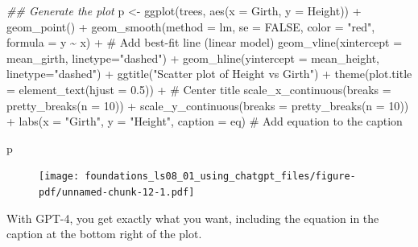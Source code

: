 \documentclass[
  letterpaper,
  DIV=11,
  numbers=noendperiod]{scrreprt}
\newenvironment{Shaded}{\begin{snugshade}}{\end{snugshade}}
\newcommand{\AttributeTok}[1]{\textcolor[rgb]{0.40,0.45,0.13}{#1}}
\newcommand{\CommentTok}[1]{\textcolor[rgb]{0.37,0.37,0.37}{#1}}
\newcommand{\ConstantTok}[1]{\textcolor[rgb]{0.56,0.35,0.01}{#1}}
\newcommand{\DecValTok}[1]{\textcolor[rgb]{0.68,0.00,0.00}{#1}}
\newcommand{\DocumentationTok}[1]{\textcolor[rgb]{0.37,0.37,0.37}{\textit{#1}}}
\newcommand{\FloatTok}[1]{\textcolor[rgb]{0.68,0.00,0.00}{#1}}
\newcommand{\FunctionTok}[1]{\textcolor[rgb]{0.28,0.35,0.67}{#1}}
\newcommand{\NormalTok}[1]{\textcolor[rgb]{0.00,0.23,0.31}{#1}}
\newcommand{\OtherTok}[1]{\textcolor[rgb]{0.00,0.23,0.31}{#1}}
\newcommand{\SpecialCharTok}[1]{\textcolor[rgb]{0.37,0.37,0.37}{#1}}
\newcommand{\StringTok}[1]{\textcolor[rgb]{0.13,0.47,0.30}{#1}}
\begin{document}
\begin{Shaded}
\begin{Highlighting}[]
\DocumentationTok{\#\# Generate the plot}
\NormalTok{p }\OtherTok{\textless{}{-}} \FunctionTok{ggplot}\NormalTok{(trees, }\FunctionTok{aes}\NormalTok{(}\AttributeTok{x =}\NormalTok{ Girth, }\AttributeTok{y =}\NormalTok{ Height)) }\SpecialCharTok{+}
  \FunctionTok{geom\_point}\NormalTok{() }\SpecialCharTok{+}
  \FunctionTok{geom\_smooth}\NormalTok{(}\AttributeTok{method =} \StringTok{\textquotesingle{}lm\textquotesingle{}}\NormalTok{, }\AttributeTok{se =} \ConstantTok{FALSE}\NormalTok{, }\AttributeTok{color =} \StringTok{"red"}\NormalTok{, }
              \AttributeTok{formula =}\NormalTok{ y }\SpecialCharTok{\textasciitilde{}}\NormalTok{ x) }\SpecialCharTok{+} \CommentTok{\# Add best{-}fit line (linear model)}
  \FunctionTok{geom\_vline}\NormalTok{(}\AttributeTok{xintercept =}\NormalTok{ mean\_girth, }\AttributeTok{linetype=}\StringTok{"dashed"}\NormalTok{) }\SpecialCharTok{+} 
  \FunctionTok{geom\_hline}\NormalTok{(}\AttributeTok{yintercept =}\NormalTok{ mean\_height, }\AttributeTok{linetype=}\StringTok{"dashed"}\NormalTok{) }\SpecialCharTok{+}
  \FunctionTok{ggtitle}\NormalTok{(}\StringTok{"Scatter plot of Height vs Girth"}\NormalTok{) }\SpecialCharTok{+}
  \FunctionTok{theme}\NormalTok{(}\AttributeTok{plot.title =} \FunctionTok{element\_text}\NormalTok{(}\AttributeTok{hjust =} \FloatTok{0.5}\NormalTok{)) }\SpecialCharTok{+}  \CommentTok{\# Center title}
  \FunctionTok{scale\_x\_continuous}\NormalTok{(}\AttributeTok{breaks =} \FunctionTok{pretty\_breaks}\NormalTok{(}\AttributeTok{n =} \DecValTok{10}\NormalTok{)) }\SpecialCharTok{+}
  \FunctionTok{scale\_y\_continuous}\NormalTok{(}\AttributeTok{breaks =} \FunctionTok{pretty\_breaks}\NormalTok{(}\AttributeTok{n =} \DecValTok{10}\NormalTok{)) }\SpecialCharTok{+}
  \FunctionTok{labs}\NormalTok{(}\AttributeTok{x =} \StringTok{"Girth"}\NormalTok{,}
       \AttributeTok{y =} \StringTok{"Height"}\NormalTok{,}
       \AttributeTok{caption =}\NormalTok{ eq)   }\CommentTok{\# Add equation to the caption}

\NormalTok{p}
\end{Highlighting}
\end{Shaded}

\begin{figure}[H]

{\centering \texttt{[image: foundations\_ls08\_01\_using\_chatgpt\_files/figure-pdf/unnamed-chunk-12-1.pdf]}

}

\end{figure}

With GPT-4, you get exactly what you want, including the equation in the
caption at the bottom right of the plot.
\end{document}

